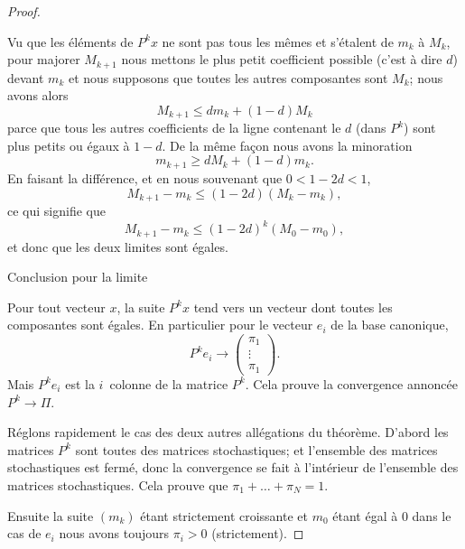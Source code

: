 \begin{proof}
\begin{subproof}
            Vu que les éléments de \( P^kx\) ne sont pas tous les mêmes et s'étalent de \( m_k\) à \( M_k\), pour majorer \( M_{k+1}\) nous mettons le plus petit coefficient possible (c'est à dire \( d\)) devant \( m_k\) et nous supposons que toutes les autres composantes sont \( M_k\); nous avons alors
            \begin{equation}
                M_{k+1}\leq dm_k+(1-d)M_k
            \end{equation}
            parce que tous les autres coefficients de la ligne contenant le \( d\) (dans \( P^k\)) sont plus petits ou égaux à \( 1-d\). De la même façon nous avons la minoration
            \begin{equation}
                m_{k+1}\geq dM_k+(1-d)m_k.
            \end{equation}
            En faisant la différence, et en nous souvenant que \( 0<1-2d<1\),
            \begin{equation}
                M_{k+1}-m_k\leq (1-2d)(M_k-m_k),
            \end{equation}
            ce qui signifie que
            \begin{equation}
                M_{k+1}-m_k\leq (1-2d)^k(M_0-m_0),
            \end{equation}
            et donc que les deux limites sont égales.

        \item[Conclusion pour la limite]

            Pour tout vecteur \( x\), la suite \( P^kx\) tend vers un vecteur dont toutes les composantes sont égales. En particulier pour le vecteur \( e_i\) de la base canonique,
            \begin{equation}
                P^ke_i\to\begin{pmatrix}
                    \pi_1    \\ 
                    \vdots    \\ 
                    \pi_1    
                \end{pmatrix}.
            \end{equation}
            Mais \( P^ke_i\) est la \( i\)\ieme\ colonne de la matrice \( P^k\). Cela prouve la convergence annoncée \( P^k\to \Pi\).
    \end{subproof}

    Réglons rapidement le cas des deux autres allégations du théorème. D'abord les matrices \( P^k\) sont toutes des matrices stochastiques; et l'ensemble des matrices stochastiques est fermé, donc la convergence se fait à l'intérieur de l'ensemble des matrices stochastiques. Cela prouve que \( \pi_1+\ldots +\pi_N=1\).

    Ensuite la suite \( (m_k)\) étant strictement croissante et \( m_0\) étant égal à \( 0\) dans le cas de \( e_i\) nous avons toujours \( \pi_i>0\) (strictement).
\end{proof}

